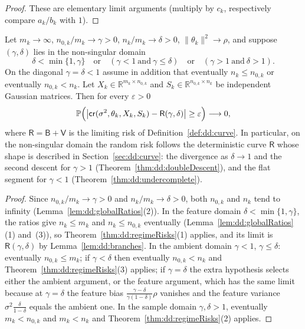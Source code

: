 \begin{proof}
  \leanok
These are elementary limit arguments (multiply by $c_k$, respectively compare $a_k/b_k$ with $1$).
\end{proof}

\begin{theorem}\label{thm:dd:globalDoubleDescent}
  \leanok
Let $m_k\to\infty$, $n_{0,k}/m_k\to\gamma>0$, $n_k/m_k\to\delta>0$, $\|\theta_k\|^2\to\rho$, and suppose $(\gamma,\delta)$ lies in the non-singular domain
\[
  \delta<\min\{1,\gamma\}\quad\text{or}\quad(\gamma<1\ \text{and}\ \gamma\le\delta)\quad\text{or}\quad(\gamma>1\ \text{and}\ \delta>1).
\]
On the diagonal $\gamma=\delta<1$ assume in addition that eventually $n_k\le n_{0,k}$ or eventually $n_{0,k}<n_k$. Let $X_k\in\mathbb R^{m_k\times n_{0,k}}$ and $S_k\in\mathbb R^{n_{0,k}\times n_k}$ be independent Gaussian matrices. Then for every $\varepsilon>0$
\[
  \mathbb P\Bigl(\bigl|\mathsf{cr}(\sigma^2,\theta_k,X_k,S_k)-\mathsf R(\gamma,\delta)\bigr|\ge\varepsilon\Bigr)\longrightarrow0,
\]
where $\mathsf R=\mathsf B+\mathsf V$ is the limiting risk of Definition~\ref{def:dd:curve}. In particular, on the non-singular domain the random risk follows the deterministic curve $\mathsf R$ whose shape is described in Section~\ref{sec:dd:curve}: the divergence as $\delta\to1$ and the second descent for $\gamma>1$ (Theorem~\ref{thm:dd:doubleDescent}), and the flat segment for $\gamma<1$ (Theorem~\ref{thm:dd:undercomplete}).
\end{theorem}

\begin{proof}
  \leanok
Since $n_{0,k}/m_k\to\gamma>0$ and $n_k/m_k\to\delta>0$, both $n_{0,k}$ and $n_k$ tend to infinity (Lemma~\ref{lem:dd:globalRatios}(2)). In the feature domain $\delta<\min\{1,\gamma\}$, the ratios give $n_k\le m_k$ and $n_k\le n_{0,k}$ eventually (Lemma~\ref{lem:dd:globalRatios}(1) and~(3)), so Theorem~\ref{thm:dd:regimeRisks}(1) applies, and its limit is $\mathsf R(\gamma,\delta)$ by Lemma~\ref{lem:dd:branches}.
In the ambient domain $\gamma<1$, $\gamma\le\delta$: eventually $n_{0,k}\le m_k$; if $\gamma<\delta$ then eventually $n_{0,k}<n_k$ and Theorem~\ref{thm:dd:regimeRisks}(3) applies; if $\gamma=\delta$ the extra hypothesis selects either the ambient argument, or the feature argument, which has the same limit because at $\gamma=\delta$ the feature bias $\frac{\gamma-\delta}{\gamma(1-\delta)}\rho$ vanishes and the feature variance $\sigma^2\frac\delta{1-\delta}$ equals the ambient one. In the sample domain $\gamma,\delta>1$, eventually $m_k<n_{0,k}$ and $m_k<n_k$ and Theorem~\ref{thm:dd:regimeRisks}(2) applies.
\end{proof}

